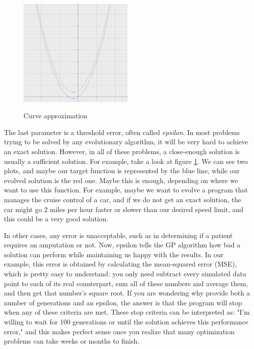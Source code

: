 \documentclass[11pt,fleqn,openany]{book} %
\begin{document}
\begin{figure}
\caption{Curve approximation}
\centering
\includegraphics[width=0.5\textwidth]{img/curve-approximation.png}
\label{figure:curve-approximation}
\end{figure}

The last parameter is a threshold error, often called \emph{epsilon}. In most problems trying to be solved by any evolutionary algorithm, it will be very hard to achieve an exact solution. However, in all of these problems, a close-enough solution is usually a sufficient solution. For example, take a look at figure \ref{figure:curve-approximation}. We can see two plots, and maybe our target function is represented by the blue line, while our evolved solution is the red one. Maybe this is enough, depending on where we want to use this function. For example, maybe we want to evolve a program that manages the cruise control of a car, and if we do not get an exact solution, the car might go 2 miles per hour faster or slower than our desired speed limit, and this could be a very good solution.

In other cases, any error is unacceptable, such as in determining if a patient requires an amputation or not. Now, epsilon tells the GP algorithm how bad a solution can perform while maintaining us happy with the results. In our example, this error is obtained by calculating the mean-squared error (MSE), which is pretty easy to understand: you only need subtract every simulated data point to each of its real counterpart, sum all of these numbers and average them, and then get that number's square root. If you are wondering why provide both a number of generations and an epsilon, the answer is that the program will stop when any of these criteria are met. These stop criteria can be interpreted as: "I'm willing to wait for 100 generations or until the solution achieves this performance error," and this makes perfect sense once you realize that many optimization problems can take weeks or months to finish.
\end{document}
